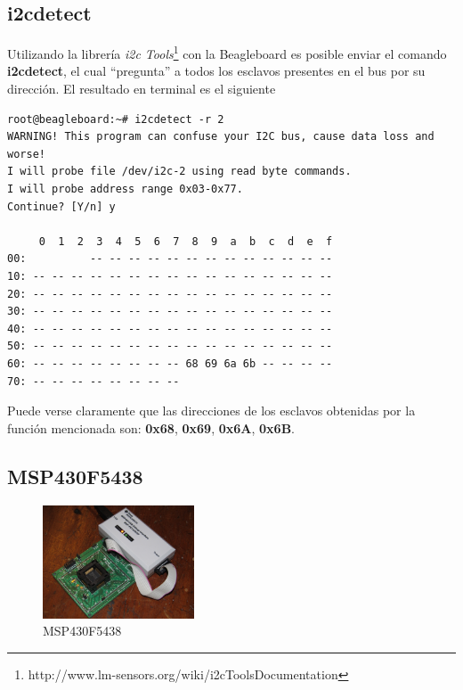 \documentclass[main]{subfiles}
\begin{document}
\subsection*{i2cdetect}
Utilizando la librer\'ia \emph{i2c Tools}\footnote{http://www.lm-sensors.org/wiki/i2cToolsDocumentation} con la Beagleboard es posible enviar el comando \textbf{i2cdetect}, el cual ``pregunta'' a todos los esclavos presentes en el bus por su direcci\'on. El resultado en terminal es el siguiente
\begin{verbatim}
root@beagleboard:~# i2cdetect -r 2
WARNING! This program can confuse your I2C bus, cause data loss and worse!
I will probe file /dev/i2c-2 using read byte commands.
I will probe address range 0x03-0x77.
Continue? [Y/n] y

     0  1  2  3  4  5  6  7  8  9  a  b  c  d  e  f
00:          -- -- -- -- -- -- -- -- -- -- -- -- -- 
10: -- -- -- -- -- -- -- -- -- -- -- -- -- -- -- -- 
20: -- -- -- -- -- -- -- -- -- -- -- -- -- -- -- -- 
30: -- -- -- -- -- -- -- -- -- -- -- -- -- -- -- -- 
40: -- -- -- -- -- -- -- -- -- -- -- -- -- -- -- -- 
50: -- -- -- -- -- -- -- -- -- -- -- -- -- -- -- -- 
60: -- -- -- -- -- -- -- -- 68 69 6a 6b -- -- -- -- 
70: -- -- -- -- -- -- -- --
\end{verbatim}

Puede verse claramente que las direcciones de los esclavos obtenidas por la funci\'on mencionada son: \textbf{0x68}, \textbf{0x69}, \textbf{0x6A}, \textbf{0x6B}.

\subsection*{MSP430F5438}
\label{sec:MSP}
\begin{figure}
	\begin{center}
	\includegraphics[width=0.4\textwidth]{./pics_sniffer/MSP430F5438.jpg}
	\end{center}
	\vspace{-20pt}
	\caption{MSP430F5438}
	\label{fig:MSP430F5438}
\end{figure}
\end{document}
